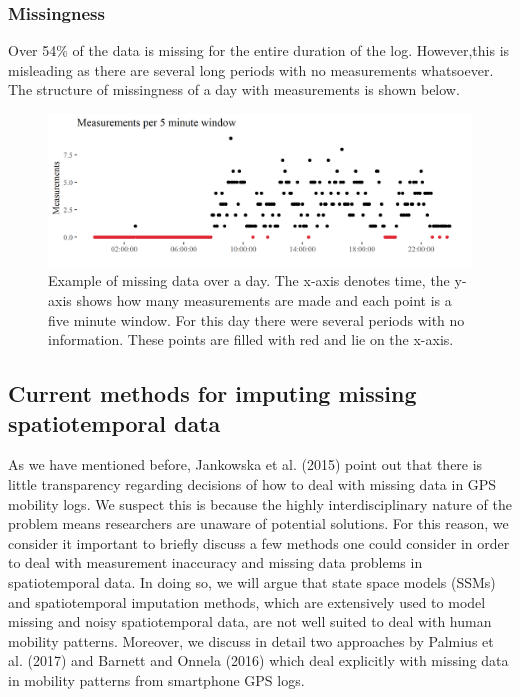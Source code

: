 \documentclass[english,man]{apa6}
\theoremstyle{definition}
\theoremstyle{definition}
\theoremstyle{definition}
\theoremstyle{remark}
\begin{document}
\subsubsection{Missingness}\label{missingness}

Over 54\% of the data is missing for the entire duration of the log.
However,this is misleading as there are several long periods with no
measurements whatsoever. The structure of missingness of a day with
measurements is shown below.

\begin{figure}
\includegraphics[width=1\linewidth]{img/missingBoaz5minExample} \caption{Example of missing data over a day. The x-axis denotes time, the y-axis shows how many measurements are made and each point is a five minute window. For this day there were several periods with no information. These points are filled with red and lie on the x-axis.}\label{fig:measurementsPerDay}
\end{figure}

\subsection{Current methods for imputing missing spatiotemporal
data}\label{current-methods-for-imputing-missing-spatiotemporal-data}

As we have mentioned before, Jankowska et al. (2015) point out that
there is little transparency regarding decisions of how to deal with
missing data in GPS mobility logs. We suspect this is because the highly
interdisciplinary nature of the problem means researchers are unaware of
potential solutions. For this reason, we consider it important to
briefly discuss a few methods one could consider in order to deal with
measurement inaccuracy and missing data problems in spatiotemporal data.
In doing so, we will argue that state space models (SSMs) and
spatiotemporal imputation methods, which are extensively used to model
missing and noisy spatiotemporal data, are not well suited to deal with
human mobility patterns. Moreover, we discuss in detail two approaches
by Palmius et al. (2017) and Barnett and Onnela (2016) which deal
explicitly with missing data in mobility patterns from smartphone GPS
logs.
\end{document}
